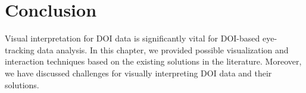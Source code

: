 \section{Conclusion}
Visual interpretation for DOI data is significantly vital for DOI-based eye-tracking data analysis. In this chapter, we provided possible visualization and interaction techniques based on the existing solutions in the literature. Moreover, we have discussed challenges for visually interpreting DOI data and their solutions. 
